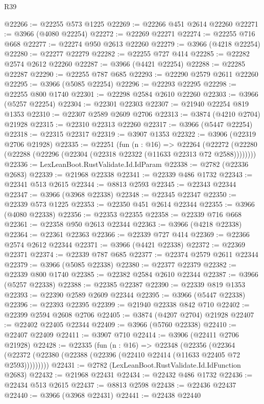 \begin{lexlean}{R39}
\begin{coremodule}
@22266 := @22255 @573 @1225
@22269 := @22266 @451 @2614 @22260
@22271 := @3966 (@4080 @22254)
@22272 := @22269 @22271
@22274 := @22255 @716 @668
@22277 := @22274 @950 @2613 @22260
@22279 := @3966 (@4218 @22254)
@22280 := @22277 @22279
@22282 := @22255 @727 @414
@22285 := @22282 @2574 @2612 @22260
@22287 := @3966 (@4421 @22254)
@22288 := @22285 @22287
@22290 := @22255 @787 @685
@22293 := @22290 @2579 @2611 @22260
@22295 := @3966 (@5085 @22254)
@22296 := @22293 @22295
@22298 := @22255 @800 @1740
@22301 := @22298 @2584 @2610 @22260
@22303 := @3966 (@5257 @22254)
@22304 := @22301 @22303
@22307 := @21940 @22254 @819 @1353
@22310 := @22307 @2589 @2609 @2706
@22313 := @3874 (@4210 @2704) @21928
@22315 := @22310 @22313 @22260
@22317 := @3966 (@5447 @22254)
@22318 := @22315 @22317
@22319 := @3907 @1353
@22322 := @3906 (@22319 @2706 @21928)
@22335 := @22251
    (fun (n : @16) =>
    @22264 (@22272 (@22280 (@22288 (@22296 (@22304 (@22318 @22322 (@11633 @22313 @72 @2588))))))))
@22336 := LexLeanBoot.RustValidate.Id.IdParam
@22338 := @2782 (@22336 @2683)
@22339 := @21968 @22338
@22341 := @22339 @486 @1732
@22343 := @22341 @513 @2615
@22344 := @8813 @2593
@22345 := @22343 @22344
@22347 := @3966 (@3968 @22338)
@22348 := @22345 @22347
@22350 := @22339 @573 @1225
@22353 := @22350 @451 @2614 @22344
@22355 := @3966 (@4080 @22338)
@22356 := @22353 @22355
@22358 := @22339 @716 @668
@22361 := @22358 @950 @2613 @22344
@22363 := @3966 (@4218 @22338)
@22364 := @22361 @22363
@22366 := @22339 @727 @414
@22369 := @22366 @2574 @2612 @22344
@22371 := @3966 (@4421 @22338)
@22372 := @22369 @22371
@22374 := @22339 @787 @685
@22377 := @22374 @2579 @2611 @22344
@22379 := @3966 (@5085 @22338)
@22380 := @22377 @22379
@22382 := @22339 @800 @1740
@22385 := @22382 @2584 @2610 @22344
@22387 := @3966 (@5257 @22338)
@22388 := @22385 @22387
@22390 := @22339 @819 @1353
@22393 := @22390 @2589 @2609 @22344
@22395 := @3966 (@5447 @22338)
@22396 := @22393 @22395
@22399 := @21940 @22338 @842 @710
@22402 := @22399 @2594 @2608 @2706
@22405 := @3874 (@4207 @2704) @21928
@22407 := @22402 @22405 @22344
@22409 := @3966 (@5760 @22338)
@22410 := @22407 @22409
@22411 := @3907 @710
@22414 := @3906 (@22411 @2706 @21928)
@22428 := @22335
    (fun (n : @16) =>
    @22348
      (@22356
        (@22364 (@22372 (@22380 (@22388 (@22396 (@22410 @22414 (@11633 @22405 @72 @2593)))))))))
@22431 := @2782 (LexLeanBoot.RustValidate.Id.IdFunction @2683)
@22432 := @21968 @22431
@22434 := @22432 @486 @1732
@22436 := @22434 @513 @2615
@22437 := @8813 @2598
@22438 := @22436 @22437
@22440 := @3966 (@3968 @22431)
@22441 := @22438 @22440

\end{coremodule}
\end{lexlean}
